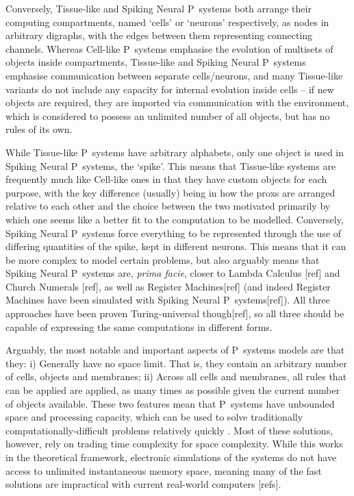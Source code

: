 Conversely, Tissue-like and Spiking Neural P~systems both arrange their computing compartments, named `cells' or `neurons' respectively, as nodes in arbitrary digraphs, with the edges between them representing connecting channels.  Whereas Cell-like P~systems emphasise the evolution of multisets of objects inside compartments, Tissue-like and Spiking Neural P~systems emphasise communication between separate cells/neurons, and many Tissue-like variants do not include any capacity for internal evolution inside cells -- if new objects are required, they are imported via communication with the environment, which is considered to possess an unlimited number of all objects, but has no rules of its own.

While Tissue-like P~systems have arbitrary alphabets, only one object is used in Spiking Neural P~systems, the `spike'.  This means that Tissue-like systems are frequently much like Cell-like ones in that they have custom objects for each purpose, with the key difference (usually) being in how the \glspl{prox} are arranged relative to each other and the choice between the two motivated primarily by which one seems like a better fit to the computation to be modelled.  Conversely, Spiking Neural P~systems force everything to be represented through the use of differing quantities of the spike, kept in different neurons.  This means that it can be more complex to model certain problems, but also arguably means that Spiking Neural P~systems are, \textit{prima facie}, closer to Lambda Calculus [ref] and Church Numerals [ref], as well as Register Machines[ref] (and indeed Register Machines have been simulated with Spiking Neural P~systems[ref]).  All three approaches have been proven Turing-universal though[ref], so all three should be capable of expressing the same computations in different forms.

Arguably, the most notable and important aspects of P~systems models are that they:  i) Generally have no space limit.  That is, they contain an arbitrary number of cells, objects and membranes;  ii) Across all cells and membranes, all rules that can be applied are applied, as many times as possible given the current number of objects available.  These two features mean that P~systems have unbounded space and processing capacity, which can be used to solve traditionally computationally-difficult problems relatively quickly \cite{Sosik2003,Jimenez2003,Paun1999a}.  Most of these solutions, however, rely on trading time complexity for space complexity.  While this works in the theoretical framework, electronic simulations of the systems do not have access to unlimited instantaneous memory space, meaning many of the fast solutions are impractical with current real-world computers [refs].

